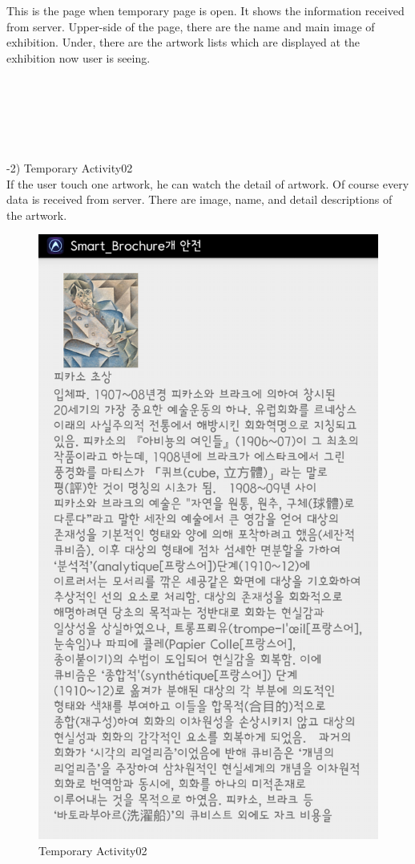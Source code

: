 \documentclass[conference]{IEEEtran}
\begin{document}
This is the page when temporary page is open. It shows the information received from server. Upper-side of the page, there are the name and main image of exhibition. Under, there are the artwork lists which are displayed at the exhibition now user is seeing.\\\\\\\\\\\\\\

-2) Temporary Activity02 \\
\quad If the user touch one artwork, he can watch the detail of artwork. Of course every data is received from server. There are image, name, and detail descriptions of the artwork. 
\begin{figure}[htbp]
\begin{center}
    \includegraphics[scale=0.18]{img_capture03}
    \caption{Temporary Activity02} 
\end{center}
\end{figure}
\\
\end{document}
